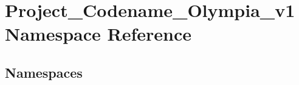 \hypertarget{namespaceProject__Codename__Olympia__v1}{}\section{Project\+\_\+\+Codename\+\_\+\+Olympia\+\_\+v1 Namespace Reference}
\label{namespaceProject__Codename__Olympia__v1}
\subsection*{Namespaces}
\begin{DoxyCompactItemize}
\end{DoxyCompactItemize}
